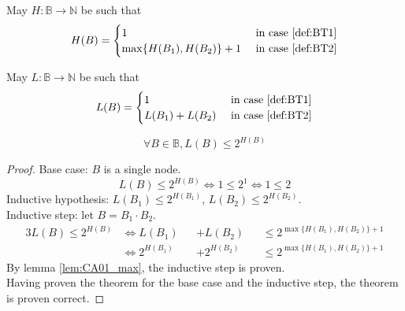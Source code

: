 \documentclass[docid=CA01]{tcom_CA}
\begin{document}
\begin{definition}
	May $H \colon \mathbb{B} \rightarrow \mathbb{N}$ be such that
	\begin{alignat*}{2}
		H(B)=
		\begin{cases}
			1                    & \text{ in case \ref{def:BT1}} \\
			\max \{H(B_1),H(B_2) \} +1 & \text{ in case \ref{def:BT2}}
		\end{cases}
	\end{alignat*}
\end{definition}

\begin{definition}
	May $L \colon \mathbb{B} \rightarrow \mathbb{N}$ be such that
	\begin{alignat*}{2}
		L(B)=
		\begin{cases}
			1             & \text{ in case \ref{def:BT1}} \\
			L(B_1)+L(B_2) & \text{ in case \ref{def:BT2}}
		\end{cases}
	\end{alignat*}
\end{definition}

\begin{theorem}
\begin{equation*}
	\forall B \in \mathbb{B}, L(B) \leq 2^{H(B)}
\end{equation*}
\end{theorem}

\begin{proof}
Base case: $B$ is a single node.
\begin{equation*}
	L(B) \leq 2^{H(B)}
	\iff 1 \leq 2^1
	\iff 1 \leq 2
\end{equation*}
Inductive hypothesis: $L(B_1) \leq 2^{H(B_1)}$, $L(B_2) \leq 2^{H(B_2)}$.\\
Inductive step: let $B=B_1 \cdot B_2$.
\begin{alignat*}{3}
	L(B) \leq 2^{H(B)}
	&\iff L(B_1)    &&+L(B_2)     && \leq 2^{\max \{ H(B_1),H(B_2) \} +1 }\\
	&\iff 2^{H(B_1)}&&+2^{H(B_2)} && \leq 2^{\max \{ H(B_1),H(B_2) \} +1 }
\end{alignat*}
By lemma \ref{lem:CA01_max}, the inductive step is proven.\\
Having proven the theorem for the base case and the inductive step, the theorem is proven correct.
\end{proof}
\end{document}
